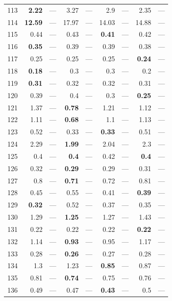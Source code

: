 \begin{longtable}{lr@{\hskip 4pt}l@{\hskip 12pt}r@{\hskip 4pt}l@{\hskip 12pt}r@{\hskip 4pt}l@{\hskip 12pt}r@{\hskip 4pt}l@{\hskip 12pt}}
113 & \textbf{2.22} & --- & 3.27 & --- & 2.9 & --- & 2.35 & --- \\
114 & \textbf{12.59} & --- & 17.97 & --- & 14.03 & --- & 14.88 & --- \\
\midrule
115 & 0.44 & --- & 0.43 & --- & \textbf{0.41} & --- & 0.42 & --- \\
116 & \textbf{0.35} & --- & 0.39 & --- & 0.39 & --- & 0.38 & --- \\
117 & 0.25 & --- & 0.25 & --- & 0.25 & --- & \textbf{0.24} & --- \\
118 & \textbf{0.18} & --- & 0.3 & --- & 0.3 & --- & 0.2 & --- \\
119 & \textbf{0.31} & --- & 0.32 & --- & 0.32 & --- & 0.31 & --- \\
120 & 0.39 & --- & 0.4 & --- & 0.3 & --- & \textbf{0.25} & --- \\
121 & 1.37 & --- & \textbf{0.78} & --- & 1.21 & --- & 1.12 & --- \\
122 & 1.11 & --- & \textbf{0.68} & --- & 1.1 & --- & 1.13 & --- \\
123 & 0.52 & --- & 0.33 & --- & \textbf{0.33} & --- & 0.51 & --- \\
124 & 2.29 & --- & \textbf{1.99} & --- & 2.04 & --- & 2.3 & --- \\
125 & 0.4 & --- & \textbf{0.4} & --- & 0.42 & --- & \textbf{0.4} & --- \\
126 & 0.32 & --- & \textbf{0.29} & --- & 0.29 & --- & 0.31 & --- \\
127 & 0.8 & --- & \textbf{0.71} & --- & 0.72 & --- & 0.81 & --- \\
128 & 0.45 & --- & 0.55 & --- & 0.41 & --- & \textbf{0.39} & --- \\
129 & \textbf{0.32} & --- & 0.52 & --- & 0.37 & --- & 0.35 & --- \\
130 & 1.29 & --- & \textbf{1.25} & --- & 1.27 & --- & 1.43 & --- \\
131 & 0.22 & --- & 0.22 & --- & 0.22 & --- & \textbf{0.22} & --- \\
132 & 1.14 & --- & \textbf{0.93} & --- & 0.95 & --- & 1.17 & --- \\
133 & 0.28 & --- & \textbf{0.26} & --- & 0.27 & --- & 0.28 & --- \\
134 & 1.3 & --- & 1.23 & --- & \textbf{0.85} & --- & 0.87 & --- \\
135 & 0.81 & --- & \textbf{0.74} & --- & 0.75 & --- & 0.76 & --- \\
136 & 0.49 & --- & 0.47 & --- & \textbf{0.43} & --- & 0.5 & --- \\

\end{longtable}
